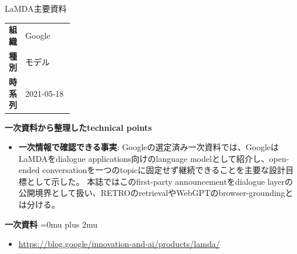 \begin{technicalnote}{LaMDA}{主要資料}
\begingroup
\begin{tabularx}{\linewidth}{@{}>{\bfseries}p{0.22\linewidth}X@{}}
組織 & Google \\
種別 & モデル \\
時系列 & 2021-05-18 \\
\end{tabularx}
\smallskip
{\bfseries 一次資料から整理したtechnical points}
\begin{itemize}[leftmargin=1.5em,itemsep=0.35em]
\item \textbf{一次情報で確認できる事実}: Googleの選定済み一次資料では、GoogleはLaMDAをdialogue applications向けのlanguage modelとして紹介し、open-ended conversationを一つのtopicに固定せず継続できることを主要な設計目標として示した。 本誌ではこのfirst-party announcementをdialogue layerの公開境界として扱い、RETROのretrievalやWebGPTのbrowser-groundingとは分ける。
\end{itemize}
\begin{minipage}{\linewidth}
\begin{samepage}
{\bfseries 一次資料}
\begingroup\sloppy
\Urlmuskip=0mu plus 2mu\relax
\begin{itemize}[leftmargin=1.5em,itemsep=0.25em]
\item {\scriptsize\url{https://blog.google/innovation-and-ai/products/lamda/}}
\end{itemize}
\endgroup
\end{samepage}
\end{minipage}
\endgroup
\end{technicalnote}
\medskip

